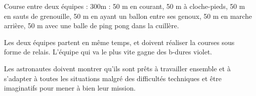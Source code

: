 \documentclass{grand-jeu}
\begin{document}
\begin{liste-materiel}

\end{liste-materiel}

\begin{regles}

Course entre deux équipes : 
300m : 50 m en courant, 50 m à cloche-pieds, 50 m en sauts de grenouille, 50 m en ayant un ballon entre ses genoux, 50 m en marche arrière, 50 m avec une balle de ping pong dans la cuillère.

Les deux équipes partent en même temps, et doivent réaliser la courses sous forme de relais. L’équipe qui va le plus vite gagne des b-dures violet. 
\end{regles}

\begin{imaginaire}
Les astronautes doivent montrer qu'ils sont prêts à travailler ensemble et à s'adapter à toutes les situations malgré des difficultés techniques et être imaginatifs pour mener à bien leur mission.  
\end{imaginaire}

\begin{moments-stop}
\end{moments-stop}
\end{document}
